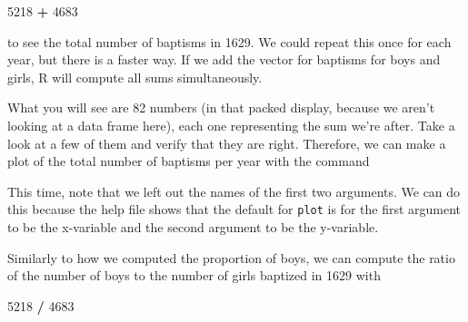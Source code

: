 \documentclass[]{book}
\newenvironment{Shaded}{\begin{snugshade}}{\end{snugshade}}
\newcommand{\DataTypeTok}[1]{\textcolor[rgb]{0.13,0.29,0.53}{#1}}
\newcommand{\DecValTok}[1]{\textcolor[rgb]{0.00,0.00,0.81}{#1}}
\newcommand{\KeywordTok}[1]{\textcolor[rgb]{0.13,0.29,0.53}{\textbf{#1}}}
\newcommand{\NormalTok}[1]{#1}
\newcommand{\OperatorTok}[1]{\textcolor[rgb]{0.81,0.36,0.00}{\textbf{#1}}}
\newcommand{\StringTok}[1]{\textcolor[rgb]{0.31,0.60,0.02}{#1}}
\theoremstyle{definition}
\theoremstyle{definition}
\theoremstyle{definition}
\theoremstyle{remark}
\begin{document}
\begin{Shaded}
\begin{Highlighting}[]
\DecValTok{5218} \OperatorTok{+}\StringTok{ }\DecValTok{4683}
\end{Highlighting}
\end{Shaded}

to see the total number of baptisms in 1629. We could repeat this once
for each year, but there is a faster way. If we add the vector for
baptisms for boys and girls, R will compute all sums simultaneously.

\begin{Shaded}
\end{Shaded}

What you will see are 82 numbers (in that packed display, because we
aren't looking at a data frame here), each one representing the sum
we're after. Take a look at a few of them and verify that they are
right. Therefore, we can make a plot of the total number of baptisms per
year with the command

\begin{Shaded}
\end{Shaded}

This time, note that we left out the names of the first two arguments.
We can do this because the help file shows that the default for
\texttt{plot} is for the first argument to be the x-variable and the
second argument to be the y-variable.

Similarly to how we computed the proportion of boys, we can compute the
ratio of the number of boys to the number of girls baptized in 1629 with

\begin{Shaded}
\begin{Highlighting}[]
\DecValTok{5218} \OperatorTok{/}\StringTok{ }\DecValTok{4683}
\end{Highlighting}
\end{Shaded}
\end{document}
